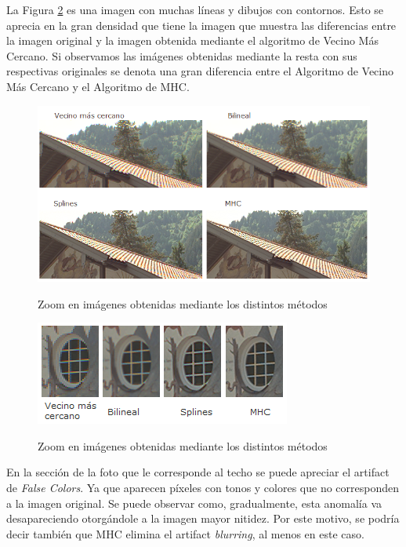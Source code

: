 \documentclass[a4paper]{article}
\begin{document}
La Figura \ref{imagen12} es una imagen con muchas l\'ineas y dibujos con contornos. Esto se aprecia en la gran densidad que tiene la imagen que muestra las diferencias entre la imagen original y la imagen obtenida  mediante el algoritmo de Vecino M\'as Cercano. Si observamos las im\'agenes obtenidas mediante la resta con sus respectivas originales se denota una gran diferencia entre el Algoritmo de Vecino M\'as Cercano y el Algoritmo de MHC.\\

\newpage

\begin{figure}[h!]
    \caption{Zoom en imágenes obtenidas mediante los distintos métodos}
    \begin{center}
    \includegraphics[scale=0.9]{imagenes/comparacion/12/techo}
    \label{imagen12}
  \end{center}
\end{figure}


\begin{figure}[h!]
    \caption{Zoom en imágenes obtenidas mediante los distintos métodos}
    \begin{center}
    \includegraphics[scale=1.1]{imagenes/comparacion/12/ventanita}
    \label{imagen12}
  \end{center}
\end{figure}

En la secci\'on de la foto que le corresponde al techo se puede apreciar el artifact de \emph{False Colors}. Ya que aparecen p\'ixeles con tonos y colores que no corresponden a la imagen original. Se puede observar como, gradualmente, esta anomal\'ia va desapareciendo otorg\'andole a la imagen mayor nitidez. Por este motivo, se podr\'ia decir tambi\'en que MHC elimina el artifact \emph{blurring}, al menos en este caso.\\
\end{document}
